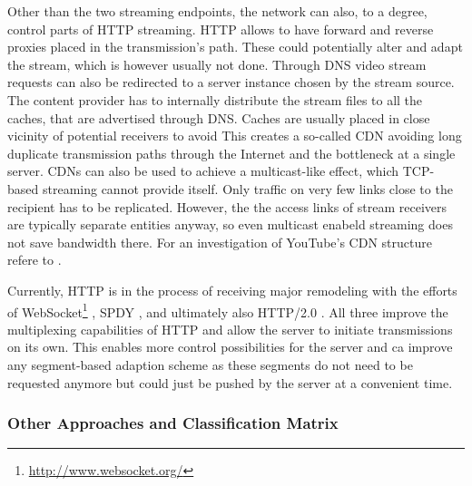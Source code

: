 Other than the two streaming endpoints, the network can also, to a degree, control parts of \gls{HTTP} streaming. \gls{HTTP} allows to have forward and reverse proxies placed in the transmission's path. These could potentially alter and adapt the stream, which is however usually not done. Through \gls{DNS} video stream requests can also be redirected to a server instance chosen by the stream source. The content provider has to internally distribute the stream files to all the caches, that are advertised through \gls{DNS}. Caches are usually placed in close vicinity of potential receivers to avoid  This creates a so-called \gls{CDN} avoiding long duplicate transmission paths through the Internet and the bottleneck at a single server. \glspl{CDN} can also be used to achieve a multicast-like effect, which \gls{TCP}-based streaming cannot provide itself. Only traffic on very few links close to the recipient has to be replicated. However, the the access links of stream receivers are typically separate entities anyway, so even multicast enabeld streaming does not save bandwidth there. For an investigation of YouTube's \gls{CDN} structure refere to \cite{rafetseder2011explyt}.

Currently, \gls{HTTP} is in the process of receiving major remodeling with the efforts of WebSocket\footnote{\url{http://www.websocket.org/}} \cite{ietf2011websocket}, SPDY \cite{google2011SPDYdef,google2010SPDYwp}, and ultimately also HTTP/2.0 \cite{http20draft}. All three improve the multiplexing capabilities of \gls{HTTP} and allow the server to initiate transmissions on its own. This enables more control possibilities for the server and ca improve any segment-based adaption scheme as these segments do not need to be requested anymore but could just be pushed by the server at a convenient time.



\subsubsection{Other Approaches and Classification Matrix}


